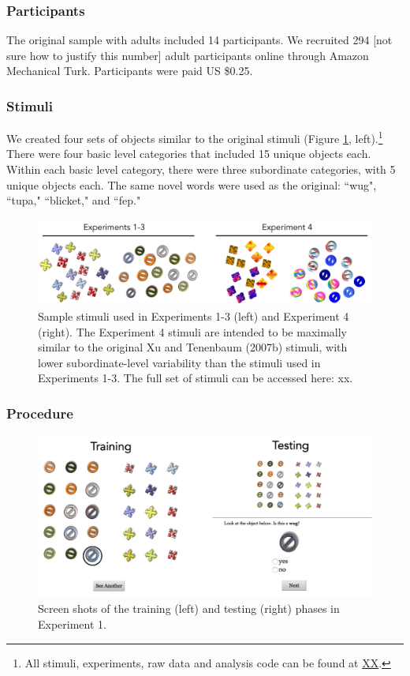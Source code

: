\documentclass[man]{apa2}
\begin{document}
\subsubsection{Participants} 
The original sample with adults included 14 participants. We recruited 294 [not sure how to justify this number] adult participants online through Amazon Mechanical Turk. Participants were paid US \$0.25. 
\subsubsection{Stimuli}
We created four sets of objects similar to the original  stimuli (Figure \ref{fig:stims}, left).\footnote{All stimuli, experiments, raw data and analysis code can be found at \url{XX}.} There were four basic level categories that included 15 unique objects each. Within each basic level category, there were three subordinate categories, with 5 unique objects each. The same novel words were used as the original: ``wug", ``tupa," ``blicket," and ``fep."
\begin{figure}[t]
 \begin{center} 
  \includegraphics[width=5in]{figures/stims.png} 
  \caption{ \label{fig:stims} Sample stimuli used in Experiments 1-3 (left) and Experiment 4 (right). The Experiment 4 stimuli are intended to be maximally similar to the original Xu and Tenenbaum (2007b) stimuli, with lower subordinate-level variability than the stimuli used in Experiments 1-3. The full set of stimuli can be accessed here: xx. 
 } 
 \end{center} 
\end{figure}	
 
\subsubsection{Procedure}
 \begin{figure} [t]
 \begin{center} 
  \includegraphics[width=5.5in]{figures/screen.png} 
  \caption{\label{fig:screen} Screen shots of the training (left) and testing (right) phases in Experiment 1. } 
 \end{center} 
\end{figure}
\end{document}
